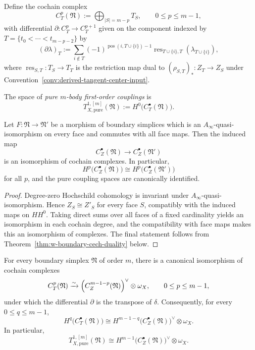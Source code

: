 \begin{definition}
\label{def:w-tangent-restriction-complex}
Define the cochain complex
\[
C_T^p(\mathfrak N):=\bigoplus_{|S|=m-p} T_S,
\qquad 0\le p\le m-1,
\]
with differential $\partial\colon C_T^p\to C_T^{p+1}$ given on the component indexed by
$T=\{t_0<\cdots<t_{m-p-2}\}$ by
\[
(\partial\lambda)_T
:=
\sum_{i\notin T}(-1)^{\operatorname{pos}(i,T\cup\{i\})-1}
\operatorname{res}_{T\cup\{i\},T}(\lambda_{T\cup\{i\}}),
\]
where $\operatorname{res}_{S,T}\colon T_S\to T_T$ is the restriction map dual to
$(\rho_{S,T})_*\colon Z_T\to Z_S$ under Convention~\ref{conv:derived-tangent-center-input}.

The space of \emph{pure $m$-body first-order couplings} is
\[
T^{1,[m]}_{X,\mathrm{pure}}(\mathfrak N):=H^0\bigl(C_T^\bullet(\mathfrak N)\bigr).
\]
\end{definition}

\begin{lemma}
\label{lem:w-boundary-simplex-homotopy-invariance}
Let $F\colon \mathfrak N\to \mathfrak N'$ be a morphism of boundary simplices which is an
$A_\infty$-quasi-isomorphism on every face and commutes with all face maps. Then the induced map
\[
C_Z^\bullet(\mathfrak N)\longrightarrow C_Z^\bullet(\mathfrak N')
\]
is an isomorphism of cochain complexes. In particular,
\[
H^p\bigl(C_Z^\bullet(\mathfrak N)\bigr)
\cong
H^p\bigl(C_Z^\bullet(\mathfrak N')\bigr)
\]
for all $p$, and the pure coupling spaces are canonically identified.
\end{lemma}

\begin{proof}
Degree-zero Hochschild cohomology is invariant under $A_\infty$-quasi-isomorphism. Hence
$Z_S\cong Z'_S$ for every face $S$, compatibly with the induced maps on $HH^0$. Taking direct sums over all faces of a fixed cardinality yields an isomorphism in each cochain degree, and the compatibility with face maps makes this an isomorphism of complexes. The final statement follows from Theorem~\ref{thm:w-boundary-cech-duality} below.
\end{proof}

\begin{theorem}
\label{thm:w-boundary-cech-duality}
For every boundary simplex $\mathfrak N$ of order $m$, there is a canonical isomorphism of cochain complexes
\[
C_T^p(\mathfrak N)
\xrightarrow{\sim}
\Bigl(C_Z^{m-1-p}(\mathfrak N)\Bigr)^\vee\otimes \omega_X,
\qquad 0\le p\le m-1,
\]
under which the differential $\partial$ is the transpose of $\delta$.
Consequently, for every $0\le q\le m-1$,
\[
H^q\bigl(C_T^\bullet(\mathfrak N)\bigr)
\cong
H^{m-1-q}\bigl(C_Z^\bullet(\mathfrak N)\bigr)^\vee\otimes \omega_X.
\]
In particular,
\[
T^{1,[m]}_{X,\mathrm{pure}}(\mathfrak N)
\cong
H^{m-1}\bigl(C_Z^\bullet(\mathfrak N)\bigr)^\vee\otimes \omega_X.
\]
\end{theorem}

